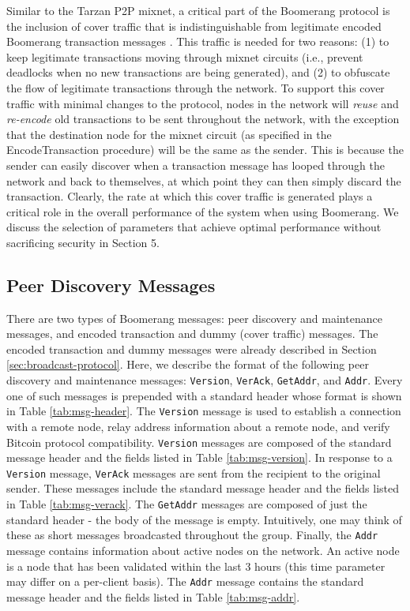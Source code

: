 Similar to the Tarzan P2P mixnet, a critical part of the Boomerang protocol is the inclusion of cover traffic that is indistinguishable from legitimate encoded Boomerang transaction messages \cite{tarzan}. This traffic is needed for two reasons: (1) to keep legitimate transactions moving through mixnet circuits (i.e., prevent deadlocks when no new transactions are being generated), and (2) to obfuscate the flow of legitimate transactions through the network. To support this cover traffic with minimal changes to the protocol, nodes in the network will \emph{reuse} and \emph{re-encode} old transactions to be sent throughout the network, with the exception that the destination node for the mixnet circuit (as specified in the {\sf EncodeTransaction} procedure) will be the same as the sender. This is because the sender can easily discover when a transaction message has looped through the network and back to themselves, at which point they can then simply discard the transaction. Clearly, the rate at which this cover traffic is generated plays a critical role in the overall performance of the system when using Boomerang. We discuss the selection of parameters that achieve optimal performance without sacrificing security in Section 5. 

\subsection{Peer Discovery Messages}
There are two types of Boomerang messages: peer discovery and maintenance messages, and encoded transaction and dummy (cover traffic) messages. The encoded transaction and dummy messages were already described in Section \ref{sec:broadcast-protocol}. Here, we describe the format of the following peer discovery and maintenance messages: {\tt Version}, {\tt VerAck}, {\tt GetAddr}, and {\tt Addr}. Every one of such messages is prepended with a standard header whose format is shown in Table \ref{tab:msg-header}. The {\tt Version} message is used to establish a connection with a remote node, relay address information about a remote node, and verify Bitcoin protocol compatibility. {\tt Version} messages are composed of the standard message header and the fields listed in Table \ref{tab:msg-version}. In response to a {\tt Version} message, {\tt VerAck} messages are sent from the recipient to the original sender. These messages include the standard message header and the fields listed in Table \ref{tab:msg-verack}. The {\tt GetAddr} messages are composed of just the standard header - the body of the message is empty. Intuitively, one may think of these as short messages broadcasted throughout the group. Finally, the {\tt Addr} message contains information about active nodes on the network. An active node is a node that has been validated within the last 3 hours (this time parameter may differ on a per-client basis). The {\tt Addr} message contains the standard message header and the fields listed in Table \ref{tab:msg-addr}. 

